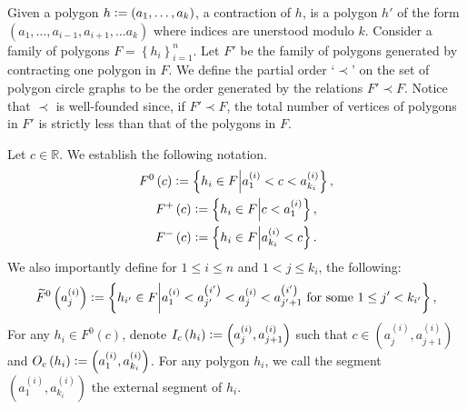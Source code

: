 \documentclass[12pt]{article}
\theoremstyle{definition}
\newcommand{\defeq}{\vcentcolon=}
\begin{document}
     Given a polygon
     $h \defeq \left(
     a_{1}, \ldots, a_{k}\right)$,
     a contraction of $h$,
     is a polygon $h'$ 
     of the form
     $\left(a_{1}, \ldots,
     a_{i-1}, a_{i+1}, \ldots
     a_{k}\right)$ 
     where indices are
     unerstood modulo $k$.
     Consider a family of
     polygons
     $F = \left\{h_{i}\right\}_{i=1}^{n}$.
     Let $F'$ be the family
     of polygons generated
     by contracting one
     polygon in $F$.
     We define the partial order
     `$\prec$' on the set
     of polygon circle graphs
     to be the order generated
     by the relations $F' \prec F$.
     Notice that $\prec$ is
     well-founded since,
     if $F' \prec F$,
     the total number of 
     vertices of polygons in
     $F'$ is strictly less than
     that of the polygons in $F$.

     Let $c \in \mathbb{R}$.
     We establish the following notation.
     \begin{gather*}
         F^{0}\left(c\right) \defeq
         \left\{h_{i} \in F \middle|
         a_{1}^{\left(i\right)}
         < c < a_{k_{i}}^{\left(i\right)}\right\}, \\
         F^{+}\left(c\right) \defeq
         \left\{h_{i} \in F \middle|
         c < a_{1}^{\left(i\right)}\right\},\\
         F^{-}\left(c\right) \defeq
         \left\{h_{i} \in F
         \middle| a_{k_{i}}^{\left(i\right)} < c\right\}.
     \end{gather*}
     We also importantly define for
     $1 \leq i \leq n$ and 
     $1 < j \leq k_{i}$, 
     the following:
     \begin{gather*}
         \widetilde{F}^{0}\left(a_{j}^{\left(i\right)}\right)
         \defeq \left\{
         h_{i'} \in F \middle|
         a_{1}^{\left(i\right)} < a_{j'}^{\left(i'\right)}
         < a_{j}^{\left(i\right)}
         < a_{j'+1}^{\left(i'\right)}
         \text{ for some }
         1 \leq j' < k_{i'} \right\},
     \end{gather*}
     For any $h_{i} \in F^{0}\left(c\right)$,
     denote $I_{c}\left(h_{i}\right)
     \defeq \left(a_{j}^{\left(i\right)},
     a_{j+1}^{\left(i\right)}\right)$ 
     such that $c \in 
     \left(a_{j}^{\left(i\right)},
     a_{j+1}^{\left(i\right)}\right)$ 
     and $O_{c}\left(h_{i}\right)
     \defeq \left(a_{1}^{\left(i\right)},
     a_{k_{i}}^{\left(i\right)}\right)$.
     For any polygon $h_{i}$,
     we call the segment
     $\left(a_{1}^{\left(i\right)},
     a_{k_{i}}^{\left(i\right)}\right)$
     the external
     segment of $h_{i}$.
\end{document}
